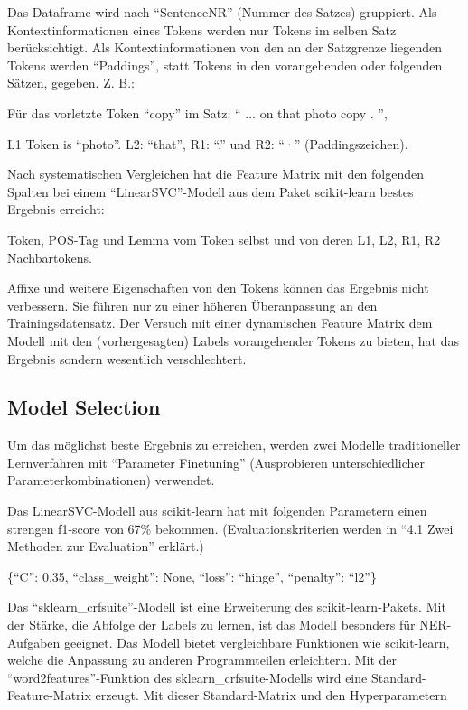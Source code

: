\documentclass[paper=A4, ngerman, fontsize=12pt]{article}
\begin{document}
	\indent
	Das Dataframe wird nach \enquote{SentenceNR} (Nummer des Satzes) gruppiert. Als Kontextinformationen eines Tokens werden nur Tokens im selben Satz berücksichtigt. Als Kontextinformationen von den an der Satzgrenze liegenden Tokens werden \enquote{Paddings}, statt Tokens in den vorangehenden oder folgenden Sätzen, gegeben. Z. B.:
	
	\indent
	Für das vorletzte Token \enquote{copy} im Satz: \enquote{ ... on that photo copy . },
	
	\indent
	L1 Token is \enquote{photo}. L2: \enquote{that}, R1: \enquote{.} und R2: \enquote{·} (Paddingszeichen).
	
	\indent
	Nach systematischen Vergleichen hat die Feature Matrix mit den folgenden Spalten bei einem \enquote{LinearSVC}-Modell aus dem Paket scikit-learn bestes Ergebnis erreicht:
	
	\indent
	Token, POS-Tag und Lemma vom Token selbst und von deren L1, L2, R1, R2 Nachbartokens. 
	
	\indent
	Affixe und weitere Eigenschaften von den Tokens können das Ergebnis nicht verbessern. Sie führen nur zu einer höheren Überanpassung an den Trainingsdatensatz. Der Versuch mit einer dynamischen Feature Matrix dem Modell mit den (vorhergesagten) Labels vorangehender Tokens zu bieten, hat das Ergebnis sondern wesentlich verschlechtert. 
	
	\subsection{Model Selection}
	\noindent
	Um das möglichst beste Ergebnis zu erreichen, werden zwei Modelle traditioneller Lernverfahren mit \enquote{Parameter Finetuning} (Ausprobieren unterschiedlicher Parameterkombinationen) verwendet. 
	
	\indent
	Das LinearSVC-Modell aus scikit-learn hat mit folgenden Parametern einen strengen f1-score von 67\% bekommen. (Evaluationskriterien werden in \enquote{4.1 Zwei Methoden zur Evaluation} erklärt.)
	
	\indent
	\{\enquote{C}: 0.35, \enquote{class\_weight}: None, \enquote{loss}: \enquote{hinge}, \enquote{penalty}: \enquote{l2}\}
	
	\indent
	Das \enquote{sklearn\_crfsuite}-Modell ist eine Erweiterung des scikit-learn-Pakets. Mit der Stärke, die Abfolge der Labels zu lernen, ist das Modell besonders für NER-Aufgaben geeignet. Das Modell bietet vergleichbare Funktionen wie scikit-learn, welche die Anpassung zu anderen Programmteilen erleichtern. Mit der \enquote{word2features}-Funktion des sklearn\_crfsuite-Modells wird eine Standard-Feature-Matrix erzeugt. Mit dieser Standard-Matrix und den Hyperparametern
	
\end{document}
